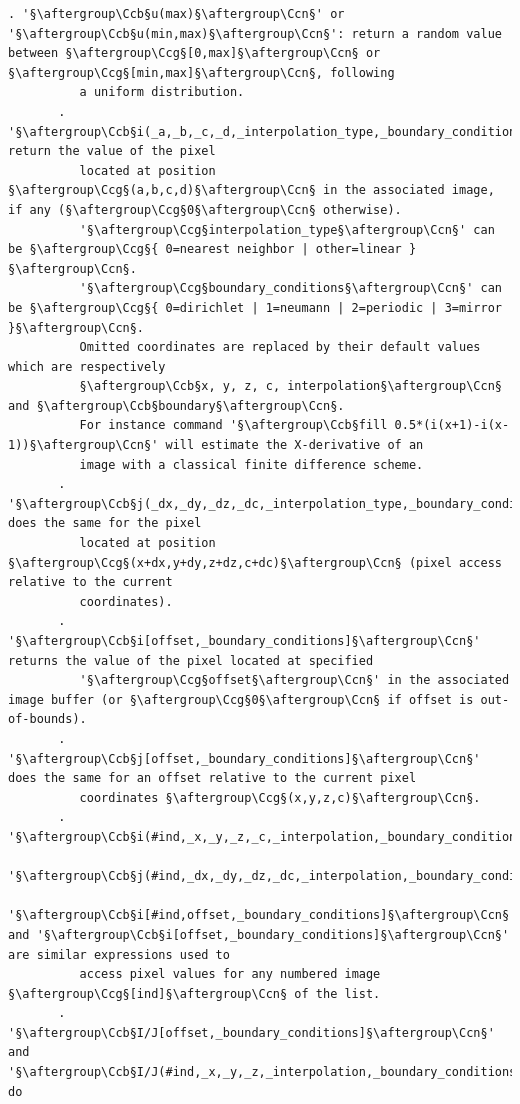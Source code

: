 \documentclass[a4paper,10.5pt,twoside]{book}
\def\Ccb{\color{cb}}
\def\Ccg{\color{cc}}
\def\Ccn{\color{black}}
\begin{document}
\begin{lstlisting}[escapechar=§]
       . '§\aftergroup\Ccb§u(max)§\aftergroup\Ccn§' or '§\aftergroup\Ccb§u(min,max)§\aftergroup\Ccn§': return a random value between §\aftergroup\Ccg§[0,max]§\aftergroup\Ccn§ or §\aftergroup\Ccg§[min,max]§\aftergroup\Ccn§, following 
          a uniform distribution. 
       . '§\aftergroup\Ccb§i(_a,_b,_c,_d,_interpolation_type,_boundary_conditions)§\aftergroup\Ccn§': return the value of the pixel 
          located at position §\aftergroup\Ccg§(a,b,c,d)§\aftergroup\Ccn§ in the associated image, if any (§\aftergroup\Ccg§0§\aftergroup\Ccn§ otherwise). 
          '§\aftergroup\Ccg§interpolation_type§\aftergroup\Ccn§' can be §\aftergroup\Ccg§{ 0=nearest neighbor | other=linear }§\aftergroup\Ccn§. 
          '§\aftergroup\Ccg§boundary_conditions§\aftergroup\Ccn§' can be §\aftergroup\Ccg§{ 0=dirichlet | 1=neumann | 2=periodic | 3=mirror }§\aftergroup\Ccn§. 
          Omitted coordinates are replaced by their default values which are respectively 
          §\aftergroup\Ccb§x, y, z, c, interpolation§\aftergroup\Ccn§ and §\aftergroup\Ccb§boundary§\aftergroup\Ccn§. 
          For instance command '§\aftergroup\Ccb§fill 0.5*(i(x+1)-i(x-1))§\aftergroup\Ccn§' will estimate the X-derivative of an 
          image with a classical finite difference scheme. 
       . '§\aftergroup\Ccb§j(_dx,_dy,_dz,_dc,_interpolation_type,_boundary_conditions)§\aftergroup\Ccn§' does the same for the pixel 
          located at position §\aftergroup\Ccg§(x+dx,y+dy,z+dz,c+dc)§\aftergroup\Ccn§ (pixel access relative to the current 
          coordinates). 
       . '§\aftergroup\Ccb§i[offset,_boundary_conditions]§\aftergroup\Ccn§' returns the value of the pixel located at specified 
          '§\aftergroup\Ccg§offset§\aftergroup\Ccn§' in the associated image buffer (or §\aftergroup\Ccg§0§\aftergroup\Ccn§ if offset is out-of-bounds). 
       . '§\aftergroup\Ccb§j[offset,_boundary_conditions]§\aftergroup\Ccn§' does the same for an offset relative to the current pixel 
          coordinates §\aftergroup\Ccg§(x,y,z,c)§\aftergroup\Ccn§. 
       . '§\aftergroup\Ccb§i(#ind,_x,_y,_z,_c,_interpolation,_boundary_conditions)§\aftergroup\Ccn§', 
          '§\aftergroup\Ccb§j(#ind,_dx,_dy,_dz,_dc,_interpolation,_boundary_conditions)§\aftergroup\Ccn§', 
          '§\aftergroup\Ccb§i[#ind,offset,_boundary_conditions]§\aftergroup\Ccn§' and '§\aftergroup\Ccb§i[offset,_boundary_conditions]§\aftergroup\Ccn§' are similar expressions used to 
          access pixel values for any numbered image §\aftergroup\Ccg§[ind]§\aftergroup\Ccn§ of the list. 
       . '§\aftergroup\Ccb§I/J[offset,_boundary_conditions]§\aftergroup\Ccn§' and '§\aftergroup\Ccb§I/J(#ind,_x,_y,_z,_interpolation,_boundary_conditions)§\aftergroup\Ccn§' do 

\end{lstlisting}
\end{document}
